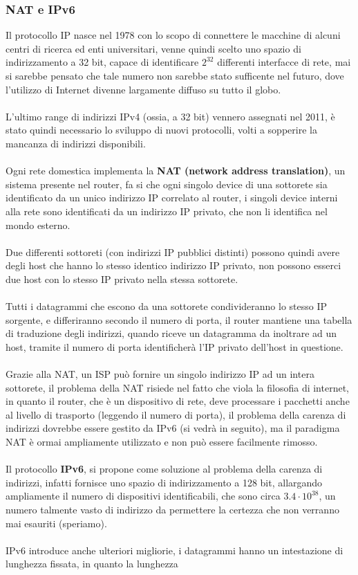 \documentclass[12pt, letterpaper]{article}
\newcommand{\acc}{\\\hphantom{}\\}
\begin{document}
\subsubsection{NAT e IPv6}
Il protocollo IP nasce nel 1978 con lo scopo di connettere le macchine di alcuni centri di ricerca ed enti universitari, 
venne quindi scelto uno spazio di indirizzamento a 32 bit, capace di identificare $2^{32}$ differenti interfacce di rete, mai si 
sarebbe pensato che tale numero non sarebbe stato sufficente nel futuro, dove l'utilizzo di Internet divenne largamente diffuso 
su tutto il globo.\acc 
L'ultimo range di indirizzi IPv4 (ossia, a 32 bit) vennero assegnati nel 2011, è stato quindi necessario lo sviluppo di nuovi 
protocolli, volti a sopperire la mancanza di indirizzi disponibili.\acc 
Ogni rete domestica implementa la \textbf{NAT (network address translation)}, un sistema presente nel router, fa si che ogni 
singolo device di una sottorete sia identificato da un unico indirizzo IP correlato al router, i singoli device 
interni alla rete sono identificati da un indirizzo IP privato, che non li identifica nel mondo esterno.\acc 
Due differenti sottoreti (con indirizzi IP pubblici distinti) possono quindi avere degli host che hanno lo stesso 
identico indirizzo IP privato, non possono esserci due host con lo stesso IP privato nella stessa sottorete.\acc 
Tutti i datagrammi che escono da una sottorete condivideranno lo stesso IP sorgente, e differiranno secondo il numero 
di porta, il router mantiene una tabella di traduzione degli indirizzi, quando riceve un datagramma da inoltrare 
ad un host, tramite il numero di porta identificherà l'IP privato dell'host in questione.\acc Grazie 
alla NAT, un ISP può fornire un singolo indirizzo IP ad un intera sottorete, il problema della NAT risiede nel fatto che 
viola la filosofia di internet, in quanto il router, che è un dispositivo di rete, deve processare i pacchetti anche 
al livello di trasporto (leggendo il numero di porta), il problema della carenza di indirizzi dovrebbe essere 
gestito da IPv6 (si vedrà in seguito), ma il paradigma NAT è ormai ampliamente utilizzato e non può essere 
facilmente rimosso.\acc 
Il protocollo \textbf{IPv6}, si propone come soluzione al problema della carenza di indirizzi, infatti fornisce uno  
spazio di indirizzamento a 128 bit, allargando ampliamente il numero di dispositivi identificabili, che sono circa $3.4\cdot 10^{38}$, 
un numero talmente vasto di indirizzo da permettere la certezza che non verranno mai esauriti (speriamo).\acc 
IPv6 introduce anche ulteriori migliorie, i datagrammi hanno un intestazione di lunghezza fissata, in quanto la lunghezza 
\end{document}
